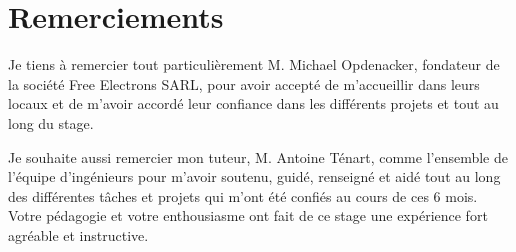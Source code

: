 \chapter*{Remerciements}
\thispagestyle{empty}
Je tiens à remercier tout particulièrement M. Michael Opdenacker, fondateur de la société Free Electrons SARL, pour avoir accepté de m'accueillir dans leurs locaux et de m'avoir accordé leur confiance dans les différents projets et tout au long du stage.
\par
Je souhaite aussi remercier mon tuteur, M. Antoine Ténart, comme l'ensemble de l'équipe d'ingénieurs pour m'avoir soutenu, guidé, renseigné et aidé tout au long des différentes tâches et projets qui m'ont été confiés au cours de ces 6 mois. Votre pédagogie et votre enthousiasme ont fait de ce stage une expérience fort agréable et instructive.
